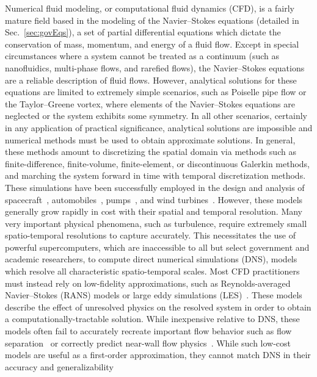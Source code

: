 Numerical fluid modeling, or computational fluid dynamics (CFD), is a fairly mature field based in the modeling of the Navier--Stokes equations (detailed in Sec.~\ref{sec:govEqs}), a set of partial differential equations which dictate the conservation of mass, momentum, and energy of a fluid flow. Except in special circumstances where a system cannot be treated as a continuum (such as nanofluidics,  multi-phase flows, and rarefied flows), the Navier--Stokes equations are a reliable description of fluid flows. However, analytical solutions for these equations are limited to extremely simple scenarios, such as Poiselle pipe flow or the Taylor--Greene vortex, where elements of the Navier--Stokes equations are neglected or the system exhibits some symmetry. In all other scenarios, certainly in any application of practical significance, analytical solutions are impossible and numerical methods must be used to obtain approximate solutions. In general, these methods amount to discretizing the spatial domain via methods such as finite-difference, finite-volume, finite-element, or discontinuous Galerkin methods, and marching the system forward in time with temporal discretization methods. These simulations have been successfully employed in the design and analysis of spacecraft~\cite{Murman2005}, automobiles~\cite{Kobayashi1992}, pumps~\cite{Shah2013}, and wind turbines~\cite{Sumner2010}. However, these models generally grow rapidly in cost with their spatial and temporal resolution. Many very important physical phenomena, such as turbulence, require extremely small spatio-temporal resolutions to capture accurately. This necessitates the use of powerful supercomputers, which are inaccessible to all but select government and academic researchers, to compute direct numerical simulations (DNS), models which resolve all characteristic spatio-temporal scales. Most CFD practitioners must instead rely on low-fidelity approximations, such as Reynolds-averaged Navier--Stokes (RANS) models or large eddy simulations (LES)~\cite{Alfonsi2009,Mason1994}. These models describe the effect of unresolved physics on the resolved system in order to obtain a computationally-tractable solution. While inexpensive relative to DNS, these models often fail to accurately recreate important flow behavior such as flow separation~\cite{Catalano2003} or correctly predict near-wall flow physics~\cite{Nicoud2011}. While such low-cost models are useful as a first-order approximation, they cannot match DNS in their accuracy and generalizability

